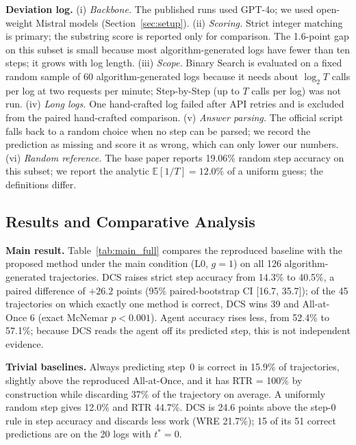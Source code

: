 \documentclass[conference]{IEEEtran}
\begin{document}
\textbf{Deviation log.} (i) \emph{Backbone.} The published runs used GPT-4o; we used open-weight Mistral models (Section~\ref{sec:setup}). (ii) \emph{Scoring.} Strict integer matching is primary; the substring score is reported only for comparison. The 1.6-point gap on this subset is small because most algorithm-generated logs have fewer than ten steps; it grows with log length. (iii) \emph{Scope.} Binary Search is evaluated on a fixed random sample of 60 algorithm-generated logs because it needs about $\log_2 T$ calls per log at two requests per minute; Step-by-Step (up to $T$ calls per log) was not run. (iv) \emph{Long logs.} One hand-crafted log failed after API retries and is excluded from the paired hand-crafted comparison. (v) \emph{Answer parsing.} The official script falls back to a random choice when no step can be parsed; we record the prediction as missing and score it as wrong, which can only lower our numbers. (vi) \emph{Random reference.} The base paper reports 19.06\% random step accuracy on this subset; we report the analytic $\mathbb{E}[1/T]=12.0\%$ of a uniform guess; the definitions differ.

\subsection{Results and Comparative Analysis}
\textbf{Main result.} Table~\ref{tab:main_full} compares the reproduced baseline with the proposed method under the main condition (L0, $g=1$) on all 126 algorithm-generated trajectories. DCS raises strict step accuracy from 14.3\% to 40.5\%, a paired difference of $+26.2$ points (95\% paired-bootstrap CI [16.7, 35.7]); of the 45 trajectories on which exactly one method is correct, DCS wins 39 and All-at-Once 6 (exact McNemar $p<0.001$). Agent accuracy rises less, from 52.4\% to 57.1\%; because DCS reads the agent off its predicted step, this is not independent evidence.



\textbf{Trivial baselines.} Always predicting step~0 is correct in 15.9\% of trajectories, slightly above the reproduced All-at-Once, and it has RTR = 100\% by construction while discarding 37\% of the trajectory on average. A uniformly random step gives 12.0\% and RTR 44.7\%. DCS is 24.6 points above the step-0 rule in step accuracy and discards less work (WRE 21.7\%); 15 of its 51 correct predictions are on the 20 logs with $t^*=0$.
\end{document}
